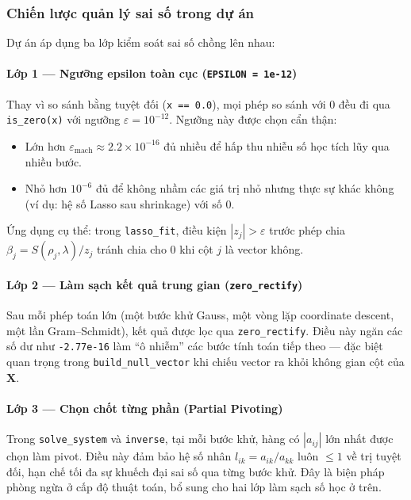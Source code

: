 \subsubsection{Chiến lược quản lý sai số trong dự án}

Dự án áp dụng ba lớp kiểm soát sai số chồng lên nhau:

\paragraph{Lớp 1 --- Ngưỡng epsilon toàn cục (\texttt{EPSILON = 1e-12})}
Thay vì so sánh bằng tuyệt đối (\texttt{x == 0.0}), mọi phép so sánh với 0 đều đi qua \texttt{is\_zero(x)} với ngưỡng $\varepsilon = 10^{-12}$. Ngưỡng này được chọn cẩn thận:
\begin{itemize}
    \item Lớn hơn $\varepsilon_\text{mach} \approx 2.2 \times 10^{-16}$ đủ nhiều để hấp thu nhiễu số học tích lũy qua nhiều bước.
    \item Nhỏ hơn $10^{-6}$ đủ để không nhầm các giá trị nhỏ nhưng thực sự khác không (ví dụ: hệ số Lasso sau shrinkage) với số 0.
\end{itemize}
Ứng dụng cụ thể: trong \texttt{lasso\_fit}, điều kiện $|z_j| > \varepsilon$ trước phép chia $\beta_j = S(\rho_j, \lambda) / z_j$ tránh chia cho 0 khi cột $j$ là vector không.

\paragraph{Lớp 2 --- Làm sạch kết quả trung gian (\texttt{zero\_rectify})}
Sau mỗi phép toán lớn (một bước khử Gauss, một vòng lặp coordinate descent, một lần Gram--Schmidt), kết quả được lọc qua \texttt{zero\_rectify}. Điều này ngăn các số dư như \texttt{-2.77e-16} làm ``ô nhiễm'' các bước tính toán tiếp theo --- đặc biệt quan trọng trong \texttt{build\_null\_vector} khi chiếu vector ra khỏi không gian cột của $\mathbf{X}$.

\paragraph{Lớp 3 --- Chọn chốt từng phần (Partial Pivoting)}
Trong \texttt{solve\_system} và \texttt{inverse}, tại mỗi bước khử, hàng có $|a_{ij}|$ lớn nhất được chọn làm pivot. Điều này đảm bảo hệ số nhân $l_{ik} = a_{ik}/a_{kk}$ luôn $\leq 1$ về trị tuyệt đối, hạn chế tối đa sự khuếch đại sai số qua từng bước khử. Đây là biện pháp phòng ngừa ở cấp độ thuật toán, bổ sung cho hai lớp làm sạch số học ở trên.

